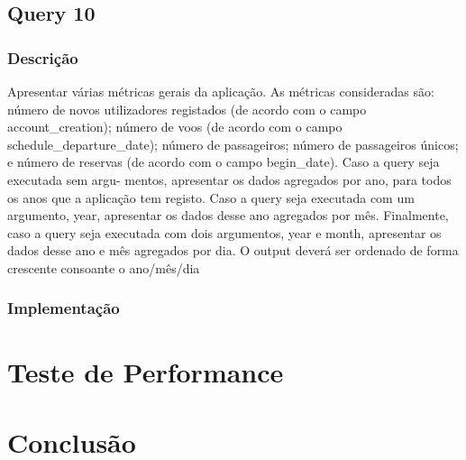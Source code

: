 \documentclass[11pt]{article}
\begin{document}
\subsection{Query 10}
\subsubsection{Descrição}
Apresentar várias métricas gerais da aplicação. As métricas consideradas são: número de novos utilizadores registados (de acordo com o campo account_creation); número de voos (de acordo
com o campo schedule_departure_date); número de passageiros; número de passageiros únicos; e
número de reservas (de acordo com o campo begin_date). Caso a query seja executada sem argu-
mentos, apresentar os dados agregados por ano, para todos os anos que a aplicação tem registo.
Caso a query seja executada com um argumento, year, apresentar os dados desse ano agregados
por mês. Finalmente, caso a query seja executada com dois argumentos, year e month, apresentar
os dados desse ano e mês agregados por dia. O output deverá ser ordenado de forma crescente
consoante o ano/mês/dia

    
\subsubsection{Implementação}


\section{Teste de Performance}


\section{Conclusão}
\end{document}
